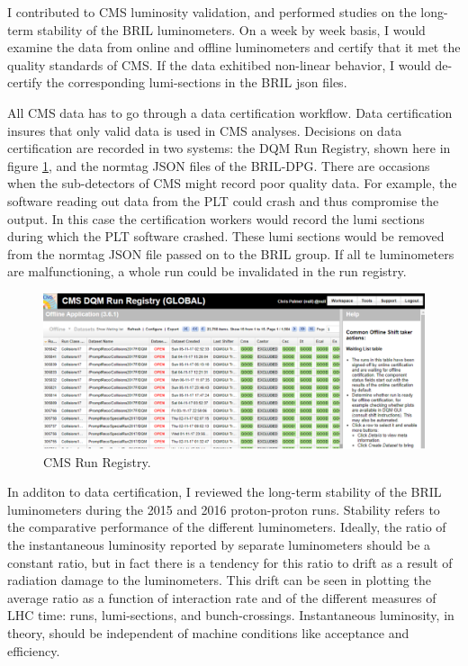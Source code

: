 I contributed to CMS luminosity validation, and performed studies on the long-term stability of the BRIL luminometers. On a week by week basis, I would examine the data from online and offline luminometers and certify that it met the quality standards of CMS. If the data exhitibed non-linear behavior, I would de-certify the corresponding lumi-sections in the BRIL json files.

All CMS data has to go through a data certification workflow. Data certification insures that only valid data is used in CMS analyses. Decisions on data certification are recorded in two systems: the DQM Run Registry, shown here in figure \ref{fig:runRegistry}, and the normtag JSON files of the BRIL-DPG. There are occasions when the sub-detectors of CMS might record poor quality data. For example, the software reading out data from the PLT could crash and thus compromise the output. In this case the certification workers would record the lumi sections during which the PLT software crashed. These lumi sections would be removed from the normtag JSON file passed on to the BRIL group. If all te luminometers are malfunctioning, a whole run could be invalidated in the run registry. 
\begin{figure}[h!]
\begin{centering}
\includegraphics[width=6in]{Chapter4/importfigs/chris_palmer_run_registry.png}
\par\end{centering}
\caption{CMS Run Registry. \label{fig:runRegistry}}
\end{figure}

In additon to data certification, I reviewed the long-term stability of the BRIL luminometers during the 2015 and 2016 proton-proton runs. Stability refers to the comparative performance of the different luminometers. Ideally, the ratio of the instantaneous luminosity reported by separate luminometers should be a constant ratio, but in fact there is a tendency for this ratio to drift as a result of radiation damage to the luminometers. This drift can be seen in plotting the average ratio as a function of interaction rate and of the different measures of LHC time: runs, lumi-sections, and bunch-crossings.  Instantaneous luminosity, in theory, should be independent of machine conditions like acceptance and efficiency. 